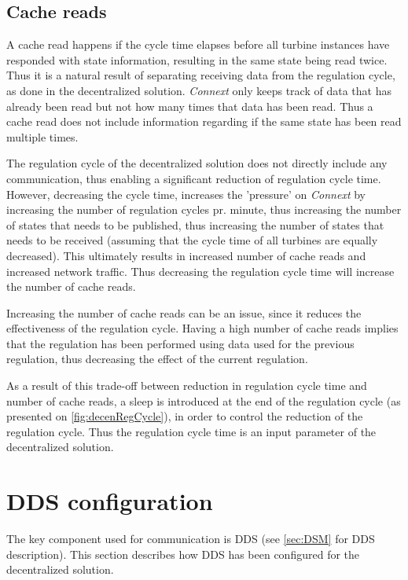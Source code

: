 \subsection{Cache reads}

A cache read happens if the cycle time elapses before all turbine instances have responded with state information, resulting in the same state being read twice. Thus it is a natural result of separating receiving data from the regulation cycle, as done in the decentralized solution. \textit{Connext} only keeps track of data that has already been read but not how many times that data has been read. Thus a cache read does not include information regarding if the same state has been read multiple times.

The regulation cycle of the decentralized solution does not directly include any communication, thus enabling a significant reduction of regulation cycle time. However, decreasing the cycle time, increases the 'pressure' on \textit{Connext} by increasing the number of regulation cycles pr. minute, thus increasing the number of states that needs to be published, thus increasing the number of states that needs to be received (assuming that the cycle time of all turbines are equally decreased). This ultimately results in increased number of cache reads and increased network traffic. Thus decreasing the regulation cycle time will increase the number of cache reads.  

Increasing the number of cache reads can be an issue, since it reduces the effectiveness of the regulation cycle. Having a high number of cache reads implies that the regulation has been performed using data used for the previous regulation, thus decreasing the effect of the current regulation.

As a result of this trade-off between reduction in regulation cycle time and number of cache reads, a sleep is introduced at the end of the regulation cycle (as presented on \cref{fig:decenRegCycle}), in order to control the reduction of the regulation cycle. Thus the regulation cycle time is an input parameter of the decentralized solution.

\section{DDS configuration} \label{sec:decen:ddsconf}

The key component used for communication is DDS (see \cref{sec:DSM} for DDS description). This section describes how DDS has been configured for the decentralized solution.

